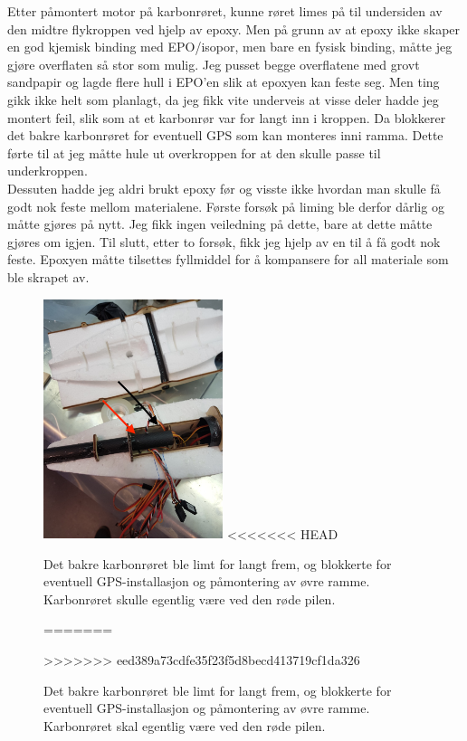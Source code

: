 \documentclass[12pt, a4paper]{article}
\begin{document}
\newpage
Etter påmontert motor på karbonrøret, kunne røret limes på til undersiden av den midtre flykroppen ved hjelp av epoxy. Men på grunn av at epoxy ikke skaper en god kjemisk binding med EPO/isopor, men bare en fysisk binding, måtte jeg gjøre overflaten så stor som mulig. Jeg pusset begge overflatene med grovt sandpapir og lagde flere hull i EPO'en slik at epoxyen kan feste seg. 
Men ting gikk ikke helt som planlagt, da jeg fikk vite underveis at visse deler hadde jeg montert feil, slik som at et karbonrør var for langt inn i kroppen. Da blokkerer det bakre karbonrøret for eventuell GPS som kan monteres inni ramma. Dette førte til at jeg måtte hule ut overkroppen for at den skulle passe til underkroppen. \\
Dessuten hadde jeg aldri brukt epoxy før og visste ikke hvordan man skulle få godt nok feste mellom materialene. Første forsøk på liming ble derfor dårlig og måtte gjøres på nytt. Jeg fikk ingen veiledning på dette, bare at dette måtte gjøres om igjen. Til slutt, etter to forsøk, fikk jeg hjelp av en til å få godt nok feste. Epoxyen måtte tilsettes fyllmiddel for å kompansere for all materiale som ble skrapet av. \\


\begin{figure}[ht]
	\centering
	\includegraphics[height = 7cm, width = .6\textwidth]{bilder/feilmontering_av_karbon_red.jpg}
<<<<<<< HEAD
	\caption{Det bakre karbonrøret ble limt for langt frem, og blokkerte for eventuell GPS-installasjon og påmontering av øvre ramme. Karbonrøret skulle egentlig være ved den røde pilen.}
=======
	\caption[Feilliming]{Det bakre karbonrøret ble limt for langt frem, og blokkerte for eventuell GPS-installasjon og påmontering av øvre ramme. Karbonrøret skal egentlig være ved den røde pilen.}
>>>>>>> eed389a73cdfe35f23f5d8becd413719cf1da326
\end{figure}
\end{document}
